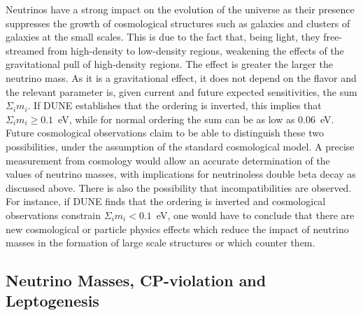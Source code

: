 Neutrinos have a strong impact on the evolution of the universe as their presence suppresses the growth of cosmological structures such as galaxies and clusters of galaxies at the small scales. This is due to the fact that, being light, they free-streamed from high-density to low-density regions, weakening the effects of the gravitational pull of high-density regions. The effect is greater the larger the neutrino mass. As it is a gravitational effect, it does not depend on the flavor and the relevant parameter is, given current and future expected sensitivities, the sum $\Sigma_i m_i$.  If DUNE establishes that the ordering is inverted, this implies that $\Sigma_i m_i \geq 0.1$~eV, while for normal ordering the sum can be as low as 0.06~eV. Future cosmological observations claim to be able to distinguish these two possibilities, under the assumption of the standard cosmological model. A precise measurement from cosmology would allow an accurate determination of the values of neutrino masses, with implications for neutrinoless double beta decay as discussed above.
There is also the possibility that incompatibilities are observed. For instance, if DUNE finds that the ordering is inverted and cosmological observations constrain $ \Sigma_i m_i < 0.1$~eV, one would have to conclude that there are new cosmological or particle physics effects which reduce the impact of neutrino masses in the formation of large scale structures or which counter them.

\subsection{Neutrino Masses, CP-violation and Leptogenesis}


